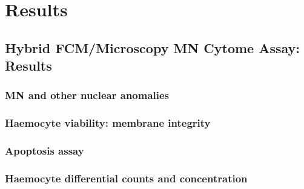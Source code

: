 \chapter{Results}
\label{chap:results}



\section{Hybrid FCM/Microscopy MN Cytome Assay: Results}
\subsection{MN and other nuclear anomalies}
\subsection{Haemocyte viability: membrane integrity}
\subsection{Apoptosis assay}
\subsection{Haemocyte differential counts and concentration}